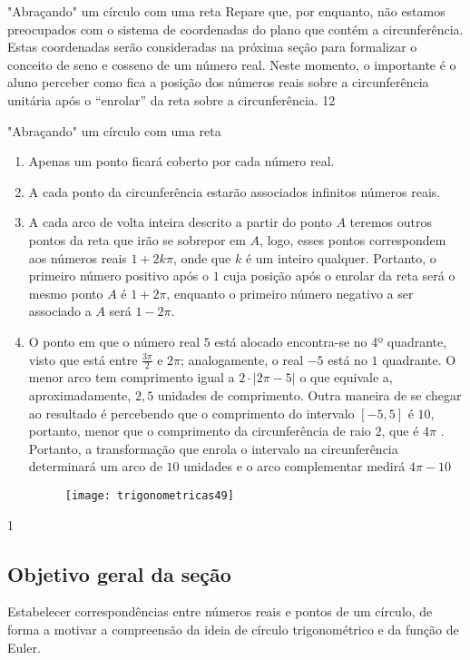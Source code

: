 \begin{sugestions}{"Abraçando"{} um círculo com uma reta}
{
Repare que, por enquanto, não estamos preocupados com o sistema de coordenadas do plano que contém a circunferência. Estas coordenadas serão consideradas na próxima seção para formalizar o conceito de seno e cosseno de um número real. Neste momento, o importante é o aluno perceber como fica a posição dos números reais sobre a circunferência unitária após o “enrolar”{} da reta sobre a circunferência.
}{1}{2}
\end{sugestions}
\clearmargin
\begin{answer}{"Abraçando"{} um círculo com uma reta}
{
\begin{enumerate}
\item Apenas um ponto ficará coberto por cada número real.
\item A cada ponto da circunferência estarão associados infinitos números reais.
\item A cada arco de volta inteira descrito a partir do ponto $A$ teremos outros pontos da reta que irão se sobrepor em $A$, logo, esses pontos correspondem aos números reais $1 + 2k\pi$, onde que $k$ é um inteiro qualquer. Portanto, o primeiro número positivo após o $1$ cuja posição após o enrolar da reta será o mesmo ponto $A$ é $1 + 2\pi$, enquanto o primeiro número negativo a ser associado a $A$ será $1 - 2\pi$.
\item O ponto em que o número real $5$ está alocado encontra-se no 4º quadrante, visto que está entre $\frac{3\pi}{2}$ e $2\pi$; analogamente, o real $-5$ está no $1$ quadrante. O menor arco tem comprimento igual a $2\cdot|2\pi-5|$ o que equivale a, aproximadamente, $2{,}5$ unidades de comprimento. Outra maneira de se chegar ao resultado é percebendo que o comprimento do intervalo $[-5,5]$ é $10$, portanto, menor que o comprimento da circunferência de raio $2$, que é $4\pi$ . Portanto, a transformação que enrola o intervalo na circunferência determinará um arco de $10$ unidades e o arco complementar medirá $4\pi − 10$

\begin{figure}[H]
\centering

\texttt{[image: trigonometricas49]}
\end{figure}
\end{enumerate}
}{1}
\end{answer}
\def\currentcolor{session4}
\begin{texto}
{
	\subsection{Objetivo geral da seção}
	Estabelecer correspondências entre números reais e pontos de um círculo, de forma a motivar a compreensão da ideia de círculo trigonométrico e da função de Euler.
}
\end{texto}
\label{trig-exp3}


